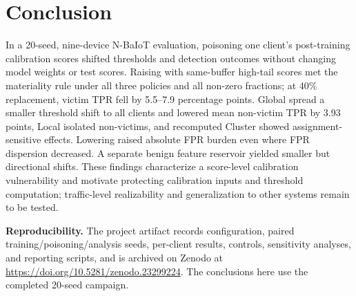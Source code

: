 \section{Conclusion}
\label{sec:conclusion}

In a 20-seed, nine-device N-BaIoT evaluation, poisoning one client's post-training calibration scores shifted thresholds and detection outcomes without changing model weights or test scores. Raising with same-buffer high-tail scores met the materiality rule under all three policies and all non-zero fractions; at 40\% replacement, victim TPR fell by 5.5--7.9 percentage points. Global spread a smaller threshold shift to all clients and lowered mean non-victim TPR by 3.93 points, Local isolated non-victims, and recomputed Cluster showed assignment-sensitive effects. Lowering raised absolute FPR burden even where FPR dispersion decreased. A separate benign feature reservoir yielded smaller but directional shifts. These findings characterize a score-level calibration vulnerability and motivate protecting calibration inputs and threshold computation; traffic-level realizability and generalization to other systems remain to be tested.

\textbf{Reproducibility.}
The project artifact records configuration, paired training/poisoning/analysis seeds, per-client results, controls, sensitivity analyses, and reporting scripts, and is archived on Zenodo at \url{https://doi.org/10.5281/zenodo.23299224}. The conclusions here use the completed 20-seed campaign.

